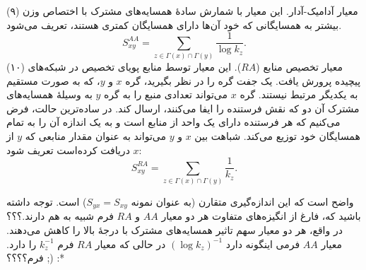 (۹) معیار آدامیک-آدار. این معیار با شمارش سادهٔ همسایه‌های مشترک با اختصاص وزن بیشتر به همسایگانی که خود آن‌ها دارای همسایگان کمتری هستند، تعریف می‌شود. 
\begin{equation}
S_{xy}^{AA}= \sum_{z\in\Gamma(x)\cap\Gamma(y)}{\frac{1}{\log k_{z}}}.
\end{equation}
(۱۰) معیار تخصیص منابع ($RA$). این معیار توسط منابع پویای تخصیص در شبکه‌های پیچیده پرورش یافت. یک جفت گره را در نظر بگیرید، گره $x$ و $y$، که به صورت مستقیم به یکدیگر مرتبط نیستند. گره $x$ می‌تواند تعدادی منبع را به گره $y$ به وسیلهٔ همسایه‌های مشترک آن دو که نقش فرستنده را ایفا می‌کنند، ارسال کند. در ساده‌ترین حالت، فرض می‌کنیم که هر فرستنده دارای یک واحد از منابع است و به یک اندازه آن را به تمام همسایگان خود توزیع می‌کند. شباهت بین $x$ و $y$ می‌تواند به عنوان مقدار منابعی که $y$ از $x$ دریافت کرده‌است تعریف شود:
\begin{equation}
S_{xy}^{RA}= \sum_{z\in\Gamma(x)\cap\Gamma(y)}{\frac{1}{k_{z}}}.
\end{equation}

واضح است که این اندازه‌گیری متقارن (به عنوان نمونه $S_{yx} = S_{xy}$) است. توجه داشته باشید که، فارغ از انگیزه‌های متفاوت هر دو معیار $AA$ و $RA$ فرم شبیه به هم دارند.؟؟؟ در واقع، هر دو معیار سهم تاثیر همسایه‌های مشترک با درجهٔ بالا را کاهش می‌دهند. معیار $AA$ فرمی اینگونه دارد $(\log k_{z})^{-1}$ در حالی که معیار $RA$ فرم $k_{z}^{-1}$ را دارد. فرم؟؟؟؟ ;) :*
